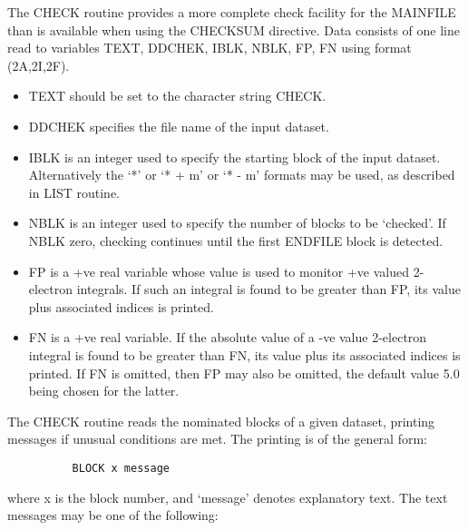 \documentclass[11pt,fleqn]{article}
\begin{document}
The CHECK routine provides a more complete check facility for the
MAINFILE than is available when using the CHECKSUM directive. Data
consists of one line read to variables TEXT, DDCHEK, IBLK, NBLK, FP, FN
using format (2A,2I,2F).
\begin{itemize}
\item  TEXT should be set to the character string CHECK.
\item  DDCHEK specifies the file name of the input dataset.
\item  IBLK is an integer used to specify the starting block of the
input dataset. Alternatively the `*' or `* + m' or
`* - m' formats may be used, as described in LIST routine.
\item  NBLK is an integer used to specify the number of blocks to be
`checked'. If NBLK zero, checking continues until the
first ENDFILE block is detected.
\item  FP is a +ve real variable whose value is used to monitor +ve
valued 2-electron integrals. If such an integral is found
to be greater than FP, its value plus associated indices
is printed.
\item  FN is a +ve real variable. If the absolute value of a -ve
value 2-electron integral is found to be greater than FN,
its value plus its associated indices is printed. If FN is
omitted, then FP may also be omitted, the default value
5.0 being chosen for the latter.
\end{itemize}
 The CHECK routine reads the nominated blocks of a given dataset,
printing messages if unusual conditions are met. The printing is of the
general form:

{
\footnotesize
\begin{verbatim}
          BLOCK x message
\end{verbatim}
}
where x is the block number, and `message' denotes explanatory text.
The text messages may be one of the following:
\vspace{0.15in}
\end{document}
